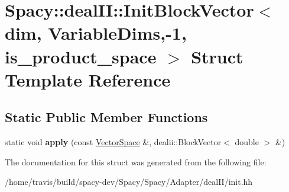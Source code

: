 \hypertarget{structSpacy_1_1dealII_1_1InitBlockVector_3_01dim_00_01VariableDims_00-1_00_01is__product__space_01_4}{\section{Spacy\-:\-:deal\-I\-I\-:\-:Init\-Block\-Vector$<$ dim, Variable\-Dims,-\/1, is\-\_\-product\-\_\-space $>$ Struct Template Reference}
\label{structSpacy_1_1dealII_1_1InitBlockVector_3_01dim_00_01VariableDims_00-1_00_01is__product__space_01_4}
}
\subsection*{Static Public Member Functions}
\begin{DoxyCompactItemize}
\item 
\hypertarget{structSpacy_1_1dealII_1_1InitBlockVector_3_01dim_00_01VariableDims_00-1_00_01is__product__space_01_4_aac1a7fc2b92980f823338760b4c1a578}{static void {\bfseries apply} (const \hyperlink{classSpacy_1_1VectorSpace}{Vector\-Space} \&, dealii\-::\-Block\-Vector$<$ double $>$ \&)}\label{structSpacy_1_1dealII_1_1InitBlockVector_3_01dim_00_01VariableDims_00-1_00_01is__product__space_01_4_aac1a7fc2b92980f823338760b4c1a578}

\end{DoxyCompactItemize}


The documentation for this struct was generated from the following file\-:\begin{DoxyCompactItemize}
\item 
/home/travis/build/spacy-\/dev/\-Spacy/\-Spacy/\-Adapter/deal\-I\-I/init.\-hh\end{DoxyCompactItemize}
